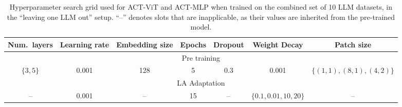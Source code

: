\begin{table}[t]
\centering
\caption{Hyperparameter search grid used for ACT-ViT and ACT-MLP when trained on the combined
set of 10 LLM datasets, in the ``leaving one LLM out'' setup. ``--'' denotes slots that are inapplicable,
as their values are inherited from the pre-trained model.}
\label{tab:hp_llmout}
\renewcommand{\arraystretch}{1.15}
\small
\begin{tabular}{|c|c|c|c|c|c|c|}
\hline
Num.\ layers & Learning rate & Embedding size & Epochs & Dropout & Weight Decay & Patch size \\
\hline
\multicolumn{7}{|c|}{Pre training} \\
\hline
$\{3, 5\}$ & 0.001 & 128 & 5 & 0.3 & 0.001 & $\{(1,1), (8,1), (4,2)\}$ \\
\hline
\multicolumn{7}{|c|}{LA Adaptation} \\
\hline
-- & 0.001 & -- & 15 & -- & $\{0.1, 0.01, 10, 20\}$ & -- \\
\hline
\end{tabular}
\end{table}
